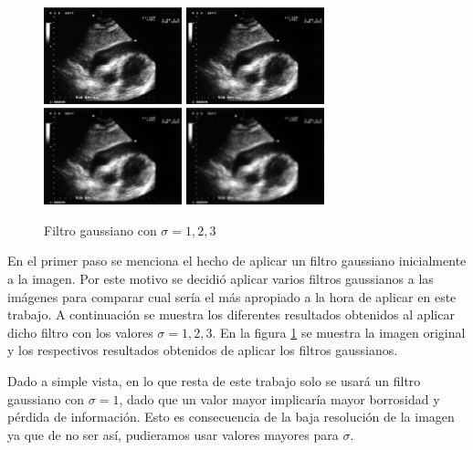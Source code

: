 \documentclass[a4paper,10pt,twocolumn]{article}
\begin{document}
\begin{figure}
	\centering
	\includegraphics[width=4cm]{image/im1/im_1}
	\includegraphics[width=4cm]{image/im1/im_1(mu=1)}
	\includegraphics[width=4cm]{image/im1/im_1(mu=2)}
	\includegraphics[width=4cm]{image/im1/im_1(mu=3)}
	\caption{Filtro gaussiano con $\sigma = 1, 2, 3$ \label{fig:filtro_gaussiano}}
\end{figure}

En el primer paso se menciona el hecho de aplicar un filtro gaussiano inicialmente a la imagen. Por este motivo se decidi\'o aplicar varios filtros gaussianos a las im\'agenes para comparar cual ser\'ia el m\'as apropiado a la hora de aplicar en este trabajo. A continuaci\'on se muestra los diferentes resultados obtenidos al aplicar dicho filtro con los valores $\sigma = 1,2,3$. En la figura \ref{fig:filtro_gaussiano} se muestra la imagen original y los respectivos resultados obtenidos de aplicar los filtros gaussianos.

Dado a simple vista, en lo que resta de este trabajo solo se usar\'a un filtro gaussiano con $\sigma = 1$, dado que un valor mayor implicar\'ia mayor borrosidad y p\'erdida de informaci\'on. Esto es consecuencia de la baja resoluci\'on de la imagen ya que de no ser as\'i, pudieramos usar valores mayores para $\sigma$.
\end{document}

